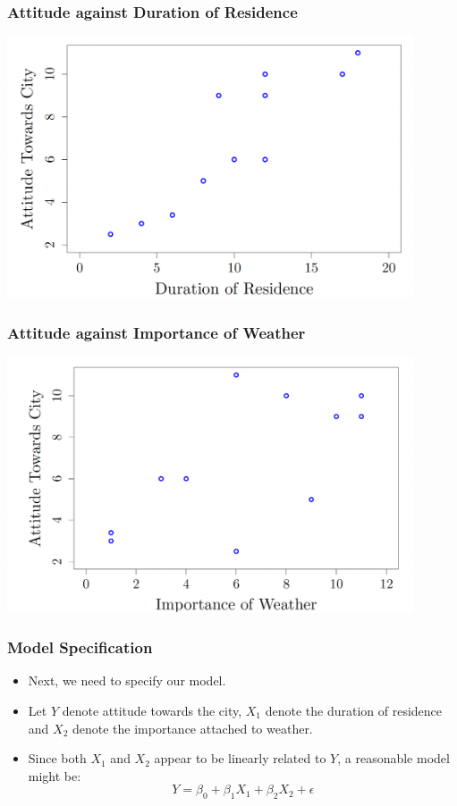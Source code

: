 \documentclass[14pt]{beamer}
\begin{document}
\begin{frame}
	\frametitle{Attitude against Duration of Residence}
	\centering
\includegraphics[width=12cm]{attitude.png}
\end{frame}
\begin{frame}
	\frametitle{Attitude against Importance of Weather}
	\centering
	\includegraphics[width=12cm]{weather.png}
\end{frame}
\begin{frame}
	\frametitle{Model Specification}
	
	\begin{itemize}[label={\color{blue}$\blacktriangleright$}]
		\item Next, we need to specify our model.
		
		\item Let $Y$ denote attitude towards the city, $X_1$ denote the duration of residence and $X_2$ denote the importance attached to weather.
		
		\item Since both $X_1$ and $X_2$ appear to be linearly related to $Y$, a reasonable model might be:
		\[
		Y = \beta_0 + \beta_1X_1 + \beta_2X_2 + \epsilon
		\]
		
	\end{itemize}
	
\end{frame}
\end{document}
